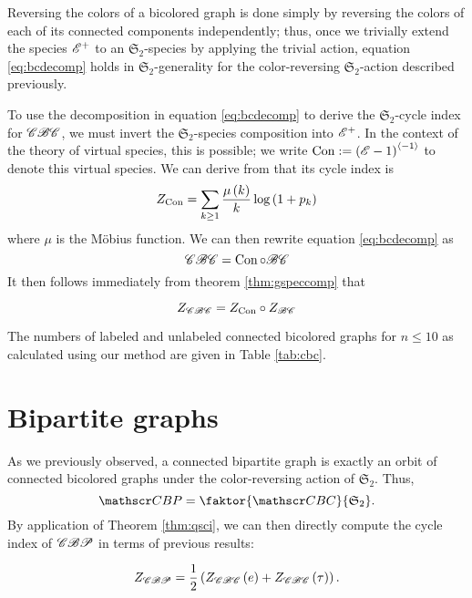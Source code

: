 \documentclass[sectionflow,singlespace,twoside]{brandiss} %
\numberwithin{section}{chapter}
\numberwithin{figure}{chapter}
\begin{document}
Reversing the colors of a bicolored graph is done simply by reversing the colors of each of its connected components independently; thus, once we trivially extend the species $\mathscr{E}^{+}$ to an $\mathfrak{S}_{2}$-species by applying the trivial action, equation \eqref{eq:bcdecomp} holds in $\mathfrak{S}_{2}$-generality for the color-reversing $\mathfrak{S}_{2}$-action described previously.

To use the decomposition in equation \eqref{eq:bcdecomp} to derive the $\mathfrak{S}_{2}$-cycle index for $\mathscr{CBC}$, we must invert the $\mathfrak{S}_{2}$-species composition into $\mathscr{E}^{+}$.
In the context of the theory of virtual species, this is possible; we write $\operatorname{Con} := \left( {\mathscr{E} - 1} \right)^{\left\langle {-1} \right\rangle}$ to denote this virtual species.
We can derive from \cite[\S 2.5, eq.\ (58c)]{bll:species} that its cycle index is
\begin{equation}
  \label{eq:zgamma}
  Z_{\operatorname{Con}} = \sum_{k \geq 1} \frac{\mu \left( {k} \right)}{k} \log \left( {1 + p_{k}} \right)
\end{equation}
where $\mu$ is the M\"{o}bius function.
We can then rewrite equation \eqref{eq:bcdecomp} as
\[\mathscr{CBC} = \operatorname{Con} \circ \mathscr{BC}\]
It then follows immediately from theorem \ref{thm:gspeccomp} that
\begin{theorem}
  \begin{equation} Z_{\mathscr{CBC}} = Z_{\operatorname{Con}} \circ Z_{\mathscr{BC}} \label{eq:zcbcdecomp} \end{equation}
\end{theorem}

The numbers of labeled and unlabeled connected bicolored graphs for $n \leq 10$ as calculated using our method are given in Table \ref{tab:cbc}.

\section{Bipartite graphs}\label{s:bp}
As we previously observed, a connected bipartite graph is exactly an orbit of connected bicolored graphs under the color-reversing action of $\mathfrak{S}_{2}$.
Thus,
\begin{equation*}
  \specname{CBP} = \faktor{\specname{CBC}}{\mathfrak{S}_{2}}.
\end{equation*}
By application of Theorem \ref{thm:qsci}, we can then directly compute the cycle index of $\mathscr{CBP}$ in terms of previous results:
\begin{theorem}
  \begin{equation}
    Z_{\mathscr{CBP}} = \frac{1}{2} \left( {Z_{\mathscr{CBC}} \left( {e} \right) + Z_{\mathscr{CBC}} \left( {\tau} \right)} \right).
  \end{equation}
\end{theorem}
\end{document}
